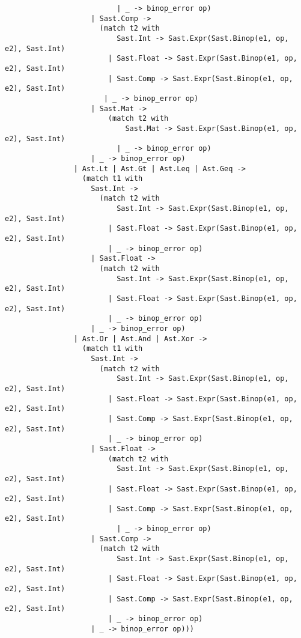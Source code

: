 \begin{lstlisting}
                          | _ -> binop_error op)
                    | Sast.Comp ->
                      (match t2 with 
                          Sast.Int -> Sast.Expr(Sast.Binop(e1, op, e2), Sast.Int)
                        | Sast.Float -> Sast.Expr(Sast.Binop(e1, op, e2), Sast.Int)
                        | Sast.Comp -> Sast.Expr(Sast.Binop(e1, op, e2), Sast.Int)
                       | _ -> binop_error op)  
                    | Sast.Mat ->
                        (match t2 with
                            Sast.Mat -> Sast.Expr(Sast.Binop(e1, op, e2), Sast.Int)
                          | _ -> binop_error op)
                    | _ -> binop_error op)
                | Ast.Lt | Ast.Gt | Ast.Leq | Ast.Geq ->
                  (match t1 with
                    Sast.Int ->
                      (match t2 with
                          Sast.Int -> Sast.Expr(Sast.Binop(e1, op, e2), Sast.Int)
                        | Sast.Float -> Sast.Expr(Sast.Binop(e1, op, e2), Sast.Int)
                        | _ -> binop_error op)
                    | Sast.Float ->
                      (match t2 with
                          Sast.Int -> Sast.Expr(Sast.Binop(e1, op, e2), Sast.Int)
                        | Sast.Float -> Sast.Expr(Sast.Binop(e1, op, e2), Sast.Int)
                        | _ -> binop_error op)
                    | _ -> binop_error op)
                | Ast.Or | Ast.And | Ast.Xor -> 
                  (match t1 with
                    Sast.Int ->
                      (match t2 with
                          Sast.Int -> Sast.Expr(Sast.Binop(e1, op, e2), Sast.Int)
                        | Sast.Float -> Sast.Expr(Sast.Binop(e1, op, e2), Sast.Int)
                        | Sast.Comp -> Sast.Expr(Sast.Binop(e1, op, e2), Sast.Int)
                        | _ -> binop_error op)
                    | Sast.Float ->
                        (match t2 with
                          Sast.Int -> Sast.Expr(Sast.Binop(e1, op, e2), Sast.Int)
                        | Sast.Float -> Sast.Expr(Sast.Binop(e1, op, e2), Sast.Int)
                        | Sast.Comp -> Sast.Expr(Sast.Binop(e1, op, e2), Sast.Int)
                          | _ -> binop_error op)
                    | Sast.Comp ->
                      (match t2 with 
                          Sast.Int -> Sast.Expr(Sast.Binop(e1, op, e2), Sast.Int)
                        | Sast.Float -> Sast.Expr(Sast.Binop(e1, op, e2), Sast.Int)
                        | Sast.Comp -> Sast.Expr(Sast.Binop(e1, op, e2), Sast.Int)
                        | _ -> binop_error op)
                    | _ -> binop_error op)))


\end{lstlisting}
